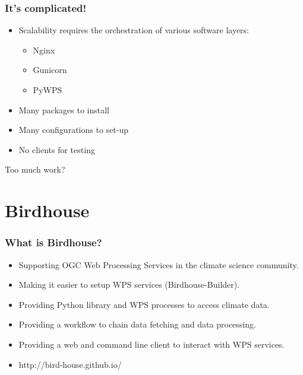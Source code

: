 \documentclass{beamer}
\begin{document}
\begin{frame}
\frametitle<presentation>{It's complicated!}

\begin{itemize}

  \item Scalability requires the orchestration of various software layers:
   \begin{itemize}
	  \item Nginx
	  \item Gunicorn
	  \item PyWPS
	\end{itemize}
  \item Many packages to install
  \item Many configurations to set-up
  \item No clients for testing
\end{itemize}

\vspace{0.4cm}
\centering
\Large{Too much work?}

\end{frame}


\section{Birdhouse}

\begin{frame}
\frametitle<presentation>{What is Birdhouse?}

\begin{itemize}
  \item Supporting OGC Web Processing Services in the climate science community.
  \item Making it easier to setup WPS services (Birdhouse-Builder).
  \item Providing Python library and WPS processes to access climate data.
  \item Providing a workflow to chain data fetching and data processing.
  \item Providing a web and command line client to interact with WPS services.
  \item http://bird-house.github.io/

\end{itemize}
\end{frame}
\end{document}
